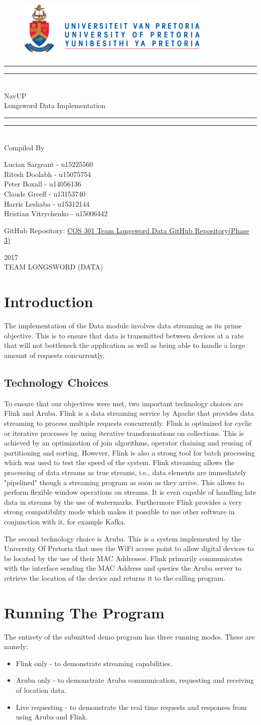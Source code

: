 \documentclass{article}
\newcommand*{\titleGP}{\begingroup
		\begin{figure}[t]
			\centering
			\includegraphics[width=350px]{UP_Logo.PNG}
		\end{figure}
\centering 
\vspace*{\baselineskip}

\rule{\textwidth}{1.6pt}\vspace*{-\baselineskip}\vspace*{2pt}
\rule{\textwidth}{0.4pt}\\[\baselineskip]

{\LARGE NavUP\\ [0.3\baselineskip] Longsword Data Implementation } \\ [0.2\baselineskip]
\rule{\textwidth}{0.4pt}\vspace*{-\baselineskip}\vspace{3.2pt}
\rule{\textwidth}{1.6pt}\\[\baselineskip] %



Compiled By \\[\baselineskip]
{\Large Lucian Sargeant - u15225560 \\ Ritesh Doolabh - u15075754 \\ Peter Boxall -  u14056136 \\ Claude Greeff - u13153740\\ Harris Leshaba - u15312144 \\ Hristian Vitrychenko - u15006442\par}

\bigskip
\bigskip

 	GitHub Repository:  
 	\href{https://github.com/Chris19951225/COS-301-Longsword-Data-Streaming}{COS 301 Team Longsword Data GitHub Repository(Phase 3)}




 

\vfill


{\scshape 2017} \\[0.3\baselineskip]
{\large TEAM LONGSWORD (DATA)}\par

\endgroup}
\begin{document}
\titleGP
\newpage
\tableofcontents

\newpage
\section{Introduction}
The implementation of the Data module involves data streaming as its prime objective. This is to ensure that data is transmitted between devices at a rate that will not bottleneck the application as well as being able to handle a large amount of requests concurrently. 

\subsection{Technology Choices}
To ensure that our objectives were met, two important technology choices are Flink and Aruba. Flink is a data streaming service by Apache that provides data streaming to process multiple requests concurrently. Flink is optimized for cyclic or iterative processes by using iterative transformations on collections. This is achieved by an optimization of join algorithms, operator chaining and reusing of partitioning and sorting. However, Flink is also a strong tool for batch processing which was used to test the speed of the system. Flink streaming allows the processing of data streams as true streams, i.e., data elements are immediately "pipelined" though a streaming program as soon as they arrive. This allows to perform flexible window operations on streams. It is even capable of handling late data in streams by the use of watermarks. Furthermore Flink provides a very strong compatibility mode which makes it possible to use other software in conjunction with it, for example Kafka. 
\begin{flushleft}
The second technology choice is Aruba. This is a system implemented by the University Of Pretoria that uses the WiFi access point to allow digital devices to be located by the use of their MAC Addresses. Flink primarily communicates with the interface sending the MAC Address and queries the Aruba server to retrieve the location of the device and returns it to the calling program. 
\end{flushleft}
\section{Running The Program}
The entirety of the submitted demo program has three running modes. These are namely:
\begin{itemize}
\item Flink only - to demonstrate streaming capabilities.
\item Aruba only - to demonstrate Aruba communication, requesting and receiving of location data.
\item Live requesting - to demonstrate the real time requests and responses from using Aruba and Flink.
\end{itemize} 
\end{document}

